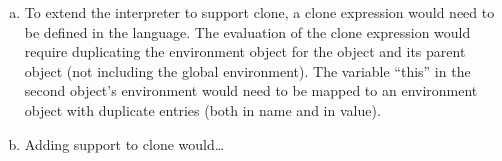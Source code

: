 \documentclass[notitlepage]{report}
\begin{document}
\begin{enumerate}
\begin{enumerate}[(a)]
			\item To extend the interpreter to support clone, a clone expression would need to be defined in the language.  The evaluation of the clone expression would require duplicating the environment object for the object and its parent object (not including the global environment).  The variable ``this'' in the second object's environment would need to be mapped to an environment object with duplicate entries (both in name and in value).
			\item Adding support to clone would\dots
		\end{enumerate}
\end{enumerate}
\end{document}
